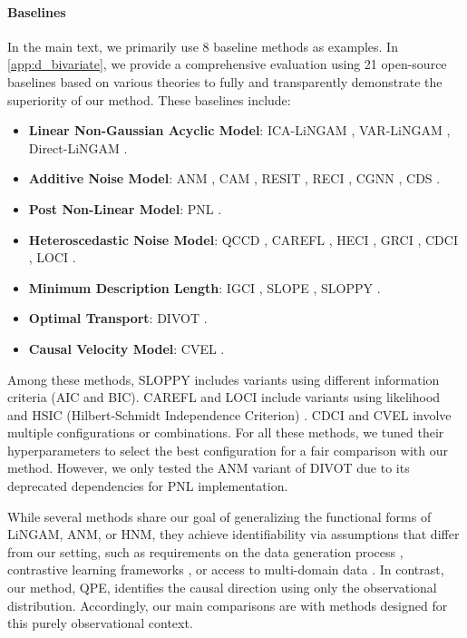 \documentclass{article}
\theoremstyle{plain}
\theoremstyle{definition}
\theoremstyle{remark}
\begin{document}
\paragraph{Baselines}

In the main text, we primarily use 8 baseline methods as examples. In \cref{app:d_bivariate}, we provide a comprehensive evaluation using 21 open-source baselines based on various theories to fully and transparently demonstrate the superiority of our method. These baselines include:

\begin{itemize}[leftmargin=*]
\itemsep0em
\item \textbf{Linear Non-Gaussian Acyclic Model}: ICA-LiNGAM \citep{Shimizu2006}, VAR-LiNGAM \citep{Hyvarinen2010}, Direct-LiNGAM \citep{Shimizu2011}.
\item \textbf{Additive Noise Model}: ANM \citep{Hoyer2008}, CAM \citep{Buhlmann2014}, RESIT \citep{Peters2014}, RECI \citep{Bloebaum2018}, CGNN \citep{Goudet2018}, CDS \citep{Fonollosa2019}.
\item \textbf{Post Non-Linear Model}: PNL \citep{Zhang2009}.
\item \textbf{Heteroscedastic Noise Model}: QCCD \citep{Tagasovska2020}, CAREFL \citep{Khemakhem2021}, HECI \citep{Xu2022}, GRCI \citep{Strobl2023}, CDCI \citep{Duong2022}, LOCI \citep{Immer2023}.
\item \textbf{Minimum Description Length}: IGCI \citep{Daniusis2010}, SLOPE \citep{Marx2019a}, SLOPPY \citep{Marx2019b}.
\item \textbf{Optimal Transport}: DIVOT \citep{Tu2022}.
\item \textbf{Causal Velocity Model}: CVEL \citep{Xi2025}.
\end{itemize}

Among these methods, SLOPPY includes variants using different information criteria (AIC and BIC). CAREFL and LOCI include variants using likelihood and HSIC (Hilbert-Schmidt Independence Criterion) \citep{Immer2023, Sun2023}. CDCI and CVEL involve multiple configurations or combinations. For all these methods, we tuned their hyperparameters to select the best configuration for a fair comparison with our method. However, we only tested the ANM variant of DIVOT due to its deprecated dependencies for PNL implementation.

While several methods share our goal of generalizing the functional forms of LiNGAM, ANM, or HNM, they achieve identifiability via assumptions that differ from our setting, such as requirements on the data generation process \citep{Guo2023}, contrastive learning frameworks \citep{Reizinger2023}, or access to multi-domain data \citep{Jalaldoust2025}. In contrast, our method, QPE, identifies the causal direction using only the observational distribution. Accordingly, our main comparisons are with methods designed for this purely observational context.
\end{document}

